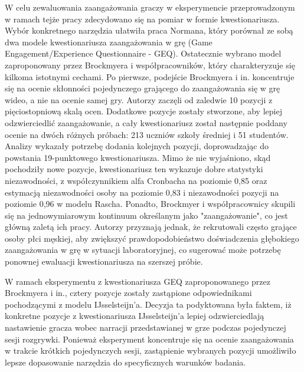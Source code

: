 W celu zewaluowania zaangażowania graczy w eksperymencie przeprowadzonym w ramach tejże pracy
zdecydowano się na pomiar w formie kwestionariusza.
Wybór konkretnego narzędzia ułatwiła praca Normana\cite{geq}, który porównał ze sobą dwa modele kwestionariusza
zaangażowania w grę (Game Engagement/Experience Questionnaire - GEQ)\cite{development_of_game}\cite{game_exp_quest}. Ostatecznie wybrano model
zaproponowany przez Brockmyera i współpracowników\cite{development_of_game}, który charakteryzuje się kilkoma istotnymi cechami.
Po pierwsze, podejście Brockmyera i in.\cite{development_of_game} koncentruje się na ocenie skłonności pojedynczego grającego do
zaangażowania się w grę wideo, a nie na ocenie samej gry\cite{geq}. Autorzy\cite{development_of_game} zaczęli od
zaledwie 10 pozycji z pięciostopniową skalą ocen. Dodatkowe pozycje zostały stworzone, aby lepiej
odzwierciedlić zaangażowanie, a cały kwestionariusz został następnie poddany ocenie na dwóch różnych próbach: 213 uczniów szkoły
średniej i 51 studentów. Analizy wykazały potrzebę dodania kolejnych pozycji, doprowadzając do powstania
19-punktowego kwestionariusza. Mimo że nie wyjaśniono, skąd pochodziły nowe pozycje, kwestionariusz ten
wykazuje dobre statystyki niezawodności\cite{geq}, z współczynnikiem alfa Cronbacha na poziomie 0,85 oraz estymacją
niezawodności osoby na poziomie 0,83 i niezawodności pozycji na poziomie 0,96 w modelu Rascha\cite{development_of_game}.
Ponadto, Brockmyer i współpracownicy\cite{development_of_game}
skupili się na jednowymiarowym kontinuum określanym jako "zaangażowanie", co jest główną zaletą ich
pracy\cite{geq}. Autorzy przyznają jednak, że rekrutowali często grające osoby płci męskiej,
aby zwiększyć prawdopodobieństwo doświadczenia głębokiego zaangażowania w grę w sytuacji
laboratoryjnej, co sugerować może potrzebę ponownej ewaluacji kwestionariusza na szerszej próbie\cite{geq}.

W ramach eksperymentu z kwestionariusza GEQ zaproponowanego przez Brockmyera i in.\cite{development_of_game}, cztery
pozycje zostały zastąpione odpowiednikami pochodzącymi z modelu IJsselsteijn'a\cite{game_exp_quest}. Decyzja ta podyktowana
była faktem, iż konkretne pozycje z kwestionariusza IJsselsteijn'a\cite{game_exp_quest} lepiej odzwierciedlają nastawienie gracza wobec
narracji przedstawianej w grze podczas pojedynczej sesji rozgrywki. Ponieważ eksperyment koncentruje się na ocenie
zaangażowania w trakcie krótkich pojedynczych sesji, zastąpienie wybranych pozycji umożliwiło lepsze
dopasowanie narzędzia do specyficznych warunków badania.

